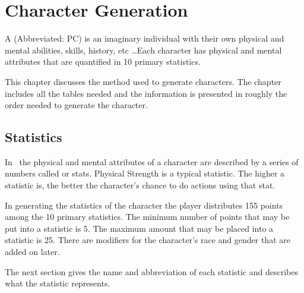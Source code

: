 \chapter{Character Generation}

A  (Abbreviated: PC) is an imaginary individual with their
own physical and mental abilities, skills, history,  etc \dots Each 
character has physical and mental attributes that are quantified in 
10 primary statistics. 

This chapter discusses the method used to generate characters. The chapter 
includes all the tables needed and the information is presented in roughly 
the order needed to generate the character.

\section{Statistics}

In \SH\ the physical and mental attributes of a character 
are described by a series of numbers called  or stats. 
Physical Strength is a typical statistic. The higher a
statistic is, the better the character's chance to do actions using  
that stat. 

In generating the statistics of the character the player distributes 155
points among the 10 primary statistics. The minimum number of points that may be
put into a statistic is 5. The maximum amount that may be placed into
a statistic is 25. There are modifiers for the character's race and gender that 
are added on later. 

The next section gives the name and abbreviation of each statistic and 
describes what the statistic represents.

\newpage
\small

